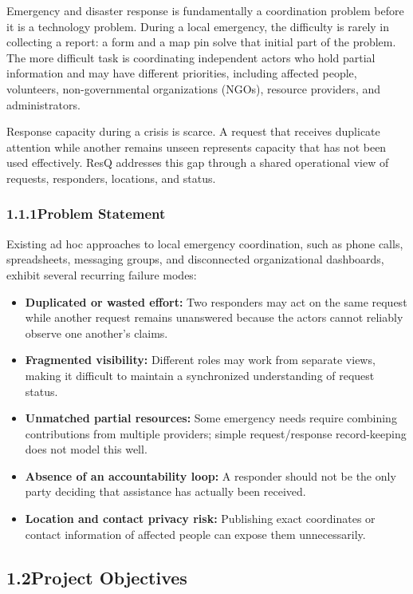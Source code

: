 \documentclass[11pt,a4paper]{article}
\begin{document}
Emergency and disaster response is fundamentally a coordination problem before it is a technology problem. During a local emergency, the difficulty is rarely in collecting a report: a form and a map pin solve that initial part of the problem. The more difficult task is coordinating independent actors who hold partial information and may have different priorities, including affected people, volunteers, non-governmental organizations (NGOs), resource providers, and administrators.

Response capacity during a crisis is scarce. A request that receives duplicate attention while another remains unseen represents capacity that has not been used effectively. ResQ addresses this gap through a shared operational view of requests, responders, locations, and status.

\subsubsection{1.1.1\quad Problem Statement}

Existing ad hoc approaches to local emergency coordination, such as phone calls, spreadsheets, messaging groups, and disconnected organizational dashboards, exhibit several recurring failure modes:

\begin{itemize}
\item \textbf{Duplicated or wasted effort:} Two responders may act on the same request while another request remains unanswered because the actors cannot reliably observe one another's claims.
\item \textbf{Fragmented visibility:} Different roles may work from separate views, making it difficult to maintain a synchronized understanding of request status.
\item \textbf{Unmatched partial resources:} Some emergency needs require combining contributions from multiple providers; simple request/response record-keeping does not model this well.
\item \textbf{Absence of an accountability loop:} A responder should not be the only party deciding that assistance has actually been received.
\item \textbf{Location and contact privacy risk:} Publishing exact coordinates or contact information of affected people can expose them unnecessarily.
\end{itemize}

\subsection{1.2\quad Project Objectives}
\end{document}
